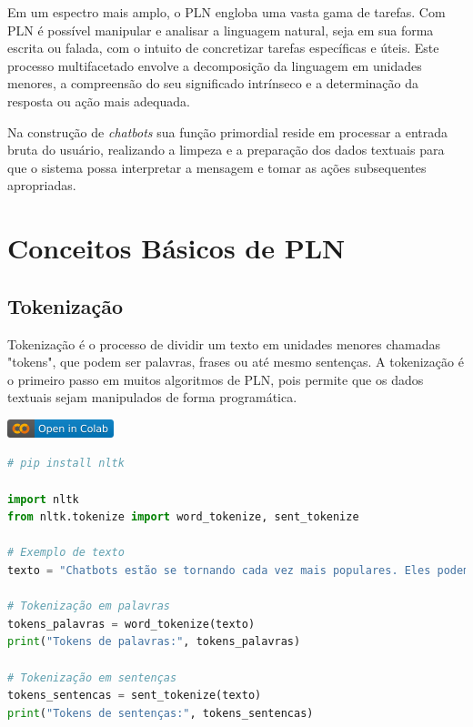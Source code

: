 \documentclass[14pt,a4paper,oneside]{book}
\begin{document}
Em um espectro mais amplo, o PLN engloba uma vasta gama de tarefas. Com PLN é possível manipular e analisar a linguagem natural, seja em sua forma escrita ou falada, com o intuito de concretizar tarefas específicas e úteis. Este processo multifacetado envolve a decomposição da linguagem em unidades menores, a compreensão do seu significado intrínseco e a determinação da resposta ou ação mais adequada.

Na construção de \textit{chatbots} sua função primordial reside em processar a entrada bruta do usuário, realizando a limpeza e a preparação dos dados textuais para que o sistema possa interpretar a mensagem e tomar as ações subsequentes apropriadas.

\section{Conceitos Básicos de PLN}

\subsection{Tokenização}

Tokenização é o processo de dividir um texto em unidades menores chamadas "tokens", que podem ser palavras, frases ou até mesmo sentenças. A tokenização é o primeiro passo em muitos algoritmos de PLN, pois permite que os dados textuais sejam manipulados de forma programática.

\vspace{\baselineskip}
\href{https://colab.research.google.com/github/giseldo/chatbotbook/blob/main/notebook/pln.ipynb}{
  \includegraphics{./fig/colab-badge.png}
}

\begin{lstlisting}[language=Python]
# pip install nltk

import nltk
from nltk.tokenize import word_tokenize, sent_tokenize

# Exemplo de texto
texto = "Chatbots estão se tornando cada vez mais populares. Eles podem realizar muitas tarefas automaticamente."

# Tokenização em palavras
tokens_palavras = word_tokenize(texto)
print("Tokens de palavras:", tokens_palavras)

# Tokenização em sentenças
tokens_sentencas = sent_tokenize(texto)
print("Tokens de sentenças:", tokens_sentencas)
\end{lstlisting}
\end{document}
